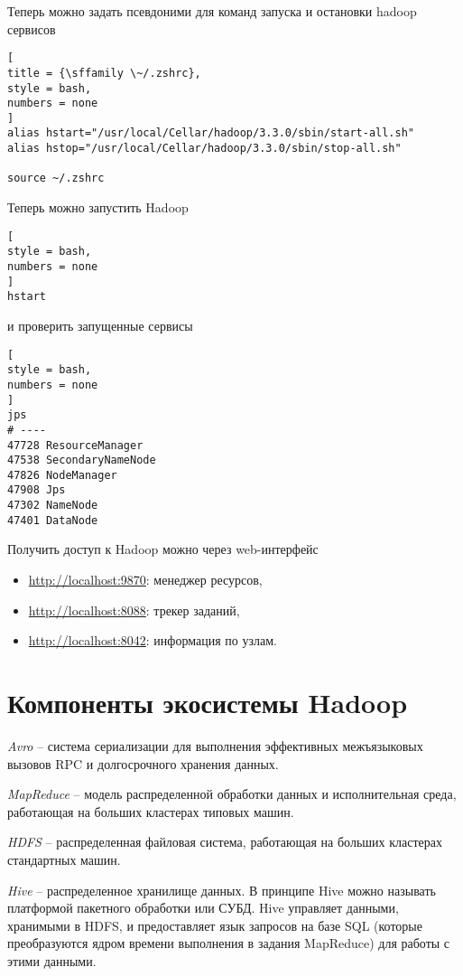 \documentclass[%
	11pt,
	a4paper,
	utf8,
		]{article}
\begin{document}
Теперь можно задать псевдоними для команд запуска и остановки hadoop сервисов
\begin{lstlisting}[
title = {\sffamily \~/.zshrc},
style = bash,
numbers = none	
]
alias hstart="/usr/local/Cellar/hadoop/3.3.0/sbin/start-all.sh"
alias hstop="/usr/local/Cellar/hadoop/3.3.0/sbin/stop-all.sh"

source ~/.zshrc
\end{lstlisting}

Теперь можно запустить Hadoop
\begin{lstlisting}[
style = bash,
numbers = none	
]
hstart
\end{lstlisting}
и проверить запущенные сервисы
\begin{lstlisting}[
style = bash,
numbers = none	
]
jps
# ----
47728 ResourceManager
47538 SecondaryNameNode
47826 NodeManager
47908 Jps
47302 NameNode
47401 DataNode
\end{lstlisting}

Получить доступ к Hadoop можно через web-интерфейс
\begin{itemize}
	\item \url{http://localhost:9870}: менеджер ресурсов,
	
	\item \url{http://localhost:8088}: трекер заданий,
	
	\item \url{http://localhost:8042}: информация по узлам.
\end{itemize}

\section{Компоненты экосистемы Hadoop}

\emph{Avro} -- система сериализации для выполнения эффективных межъязыковых вызовов RPC и долгосрочного хранения данных.

\emph{MapReduce} -- модель распределенной обработки данных и исполнительная среда, работающая на больших кластерах типовых машин.

\emph{HDFS} -- распределенная файловая система, работающая на больших кластерах стандартных машин.

\emph{Hive} -- распределенное хранилище данных. В принципе Hive можно называть платформой пакетного обработки или СУБД. Hive управляет данными, хранимыми в HDFS, и предоставляет язык запросов на базе SQL (которые преобразуются ядром времени выполнения в задания MapReduce) для работы с этими данными.
\end{document}

